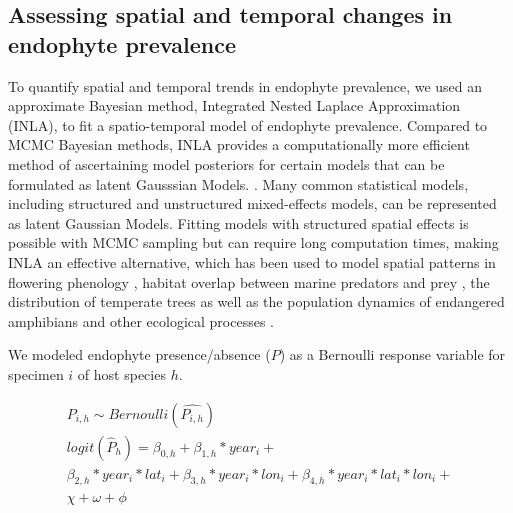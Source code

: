 \documentclass[11pt]{article}
\let\cite\citep
\begin{document}
\subsection*{Assessing spatial and temporal changes in endophyte prevalence}
To quantify spatial and temporal trends in endophyte prevalence, we used an approximate Bayesian method, Integrated Nested Laplace Approximation (INLA), to fit a spatio-temporal model of endophyte prevalence.
Compared to MCMC Bayesian methods, INLA provides a computationally more efficient method of ascertaining model posteriors for certain models that can be formulated as latent Gausssian Models.  \cite{rue2009approximate}. 
Many common statistical models, including structured and unstructured mixed-effects models, can be represented as latent Gaussian Models. 
Fitting models with structured spatial effects is possible with MCMC sampling but can require long computation times, making INLA an effective alternative, which has been used to model spatial patterns in flowering phenology \cite{willems2022forest}, habitat overlap between marine predators and prey \cite{sadykova2017bayesian}, the distribution of temperate trees \cite{engel2022spatial} as well as the population dynamics of endangered amphibians \cite{knapp2016large} and other ecological processes \cite{beguin2012hierarchical}.

We modeled endophyte presence/absence ($P$) as a Bernoulli response variable for specimen $i$ of host species $h$.

\begin{subequations}
		\label{eq:trends}
		\begin{align}
		P_{i,h} \sim Bernoulli(\hat{P_{i,h}}) \\
			logit(\hat{P}_{h}) = \beta_{0,h} + 
		\beta_{1,h}*year_{i} + \\
		\beta_{2,h}*year_{i} *lat_{i} + 
		\beta_{3,h}*year_{i} *lon_{i} + 
		\beta_{4,h}*year_{i} *lat_{i}*lon_{i} +\\
		\chi + \omega + \phi
		\end{align}
\end{subequations}
\end{document}
